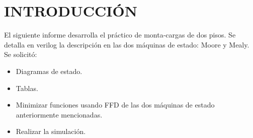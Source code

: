 \section{INTRODUCCIÓN}
\sangria{} El siguiente informe desarrolla el práctico de monta-cargas de dos pisos. Se detalla en verilog la descripción en las dos máquinas de estado: Moore y Mealy. Se solicitó:
\begin{itemize}
	\item Diagramas de estado.
	\item Tablas.
	\item Minimizar funciones usando FFD de las dos máquinas de estado anteriormente mencionadas.
	\item Realizar la simulación.
\end{itemize}
